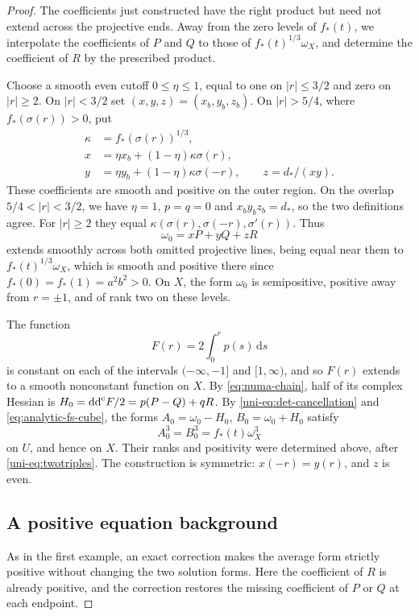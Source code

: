 \begin{proof}
The coefficients just constructed have the right product but need not extend across the projective ends. Away from the zero levels of $f_*(t)$, we interpolate the coefficients of $P$ and $Q$ to those of $f_*(t)^{1/3}\omega_X$, and determine the coefficient of $R$ by the prescribed product.

Choose a smooth even cutoff $0\leq\eta\leq1$, equal to one on
$|r|\leq3/2$ and zero on $|r|\geq2$.  On $|r|<3/2$ set
$(x,y,z)=(x_b,y_b,z_b)$.  On $|r|>5/4$, where
$f_*(\sigma(r))>0$, put
\begin{align*}
 \kappa&=f_*(\sigma(r))^{1/3},\\
 x&=\eta x_b+(1-\eta)\kappa\sigma(r),\\
 y&=\eta y_b+(1-\eta)\kappa\sigma(-r),\qquad z=d_*/(xy).
\end{align*}
These coefficients are smooth and positive on the outer region.  On the
overlap $5/4<|r|<3/2$, we have $\eta=1$, $p=q=0$ and
$x_by_bz_b=d_*$, so the two definitions agree.  For
$|r|\geq2$ they equal
$\kappa(\sigma(r),\sigma(-r),\sigma'(r))$.  Thus
\[
 \omega_0=xP+yQ+zR
\]
extends smoothly across both omitted projective lines, being equal near them
to $f_*(t)^{1/3}\omega_X$, which is smooth and positive there since
$f_*(0)=f_*(1)=a^2b^2>0$.  On $X$, the form $\omega_0$ is semipositive,
positive away from $r=\pm1$, and of rank two on these levels.

The function
\[
 F(r)=2\int_0^r p(s)\,\mathrm{d}s
\]
is constant on each of the intervals $(-\infty,-1]$ and $[1,\infty)$, and so $F(r)$ extends to a smooth nonconstant function on
$X$.  By \eqref{eq:numa-chain}, half of its complex Hessian is
$H_0=\mathrm{dd}^{\mathrm{c}} F/2=p(P-Q)+qR$.  By
\eqref{uni-eq:det-cancellation} and \eqref{eq:analytic-fs-cube}, the forms
$A_0=\omega_0-H_0$, $B_0=\omega_0+H_0$ satisfy
\[
 A_0^3=B_0^3=f_*(t)\omega_X^3
\]
on $U$, and hence on $X$.  Their ranks and positivity
were determined above, after \eqref{uni-eq:twotriples}.  The construction is
symmetric: $x(-r)=y(r)$, and $z$ is even.

\subsection{A positive equation background}
\label{subsec:analytic-repair}\label{uni-eq:repair}

As in the first example, an exact correction makes the average form strictly positive without changing the two solution forms. Here the coefficient of $R$ is already positive, and the correction restores the missing coefficient of $P$ or $Q$ at each endpoint.


\end{proof}
